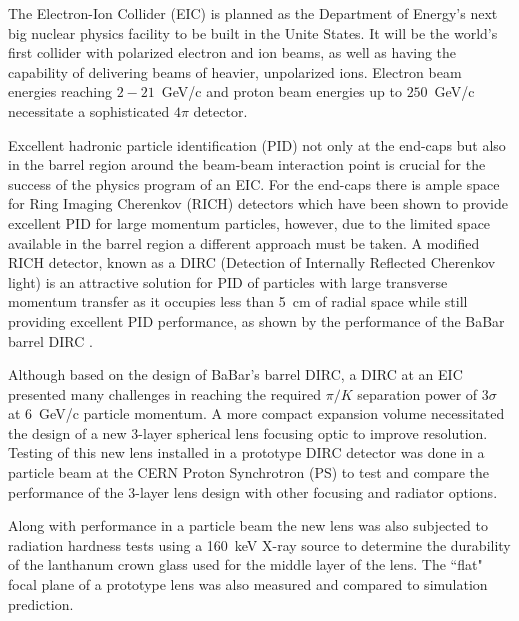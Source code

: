 \label{ch:intro}
The Electron-Ion Collider (EIC) is planned as the Department of Energy's next big nuclear physics facility to be built in the Unite States. It will be the world's first collider with polarized electron and ion beams, as well as having the capability of delivering beams of heavier, unpolarized ions. Electron beam energies reaching $2-21$~GeV/c and proton beam energies up to $250$~GeV/c necessitate a sophisticated $4\pi$ detector. 

Excellent hadronic particle identification (PID) not only at the end-caps but also in the barrel region around the beam-beam interaction point is crucial for the success of the physics program of an EIC. For the end-caps there is ample space for Ring Imaging Cherenkov (RICH) detectors which have been shown to provide excellent PID for large momentum particles, however, due to the limited space available in the barrel region a different approach must be taken. A modified RICH detector, known as a DIRC (Detection of Internally Reflected Cherenkov light) \cite{DIRCtech} is an attractive solution for PID of particles with large transverse momentum transfer as it occupies less than 5~cm of radial space while still providing excellent PID performance, as shown by the performance of the BaBar barrel DIRC \cite{BaBarDIRC}.

Although based on the design of BaBar's barrel DIRC, a DIRC at an EIC presented many challenges in reaching the required $\pi/K$ separation power of $3\sigma$ at 6~GeV/c particle momentum. A more compact expansion volume necessitated the design of a new 3-layer spherical lens focusing optic to improve resolution. Testing of this new lens installed in a prototype DIRC detector was done in a particle beam at the CERN Proton Synchrotron (PS) to test and compare the performance of the 3-layer lens design with other focusing and radiator options.

Along with performance in a particle beam the new lens was also subjected to radiation hardness tests using a 160~keV X-ray source to determine the durability of the lanthanum crown glass used for the middle layer of the lens. The ``flat" focal plane of a prototype lens was also measured and compared to simulation prediction.